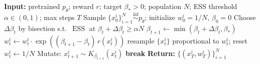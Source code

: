 \documentclass{article}
\theoremstyle{definition}
\theoremstyle{remark}
\newcommand{\gpa}{\textsc{GPA}\xspace}
\newcommand{\ESS}{\operatorname{ESS}}
\begin{document}
\begin{algorithm}[t]
\caption{\gpa{} core: ESS-adaptive annealed SMC}\label{alg:gpa}
\begin{algorithmic}[1]
\State \textbf{Input:} pretrained $p_\theta$; reward $r$; target $\beta_*\!>\!0$; population $N$; ESS threshold $\alpha\!\in\!(0,1)$; max steps $T$
\State Sample $\{x_0^i\}_{i=1}^N\overset{\text{iid}}{\sim} p_\theta$; initialize $w_0^i\!=\!1/N$, $\beta_0\!=\!0$
    \State Choose $\Delta\beta_t$ by bisection s.t.\ $\ESS$ at $\beta_t\!+\!\Delta\beta_t\geq\alpha N$ 
    \State $\beta_{t+1}\leftarrow\min(\beta_t\!+\!\Delta\beta_t,\beta_*)$
    \State $w_t^i\leftarrow w_t^i\cdot\exp((\beta_{t+1}\!-\!\beta_t)\,r(x_t^i))$
    \If{$\ESS<\alpha N$} resample $\{x_t^i\}$ proportional to $w_t^i$; reset $w_t^i\!\leftarrow\!1/N$ \EndIf
    \State Mutate: $x_{t+1}^i\sim K_{\beta_{t+1}}(x_t^i)$ 
     \textbf{break} \EndIf
\EndFor
\State \textbf{Return:} $\{(x_T^i,w_T^i)\}_{i=1}^N$
\end{algorithmic}
\end{algorithm}
\end{document}
